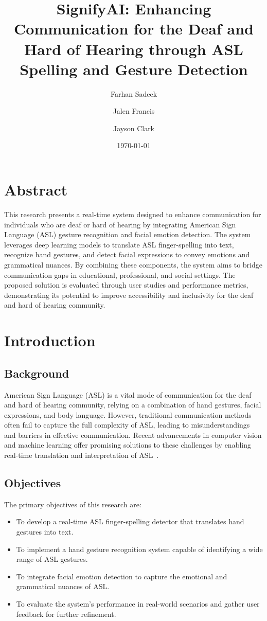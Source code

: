 \documentclass{article}
\title{SignifyAI: Enhancing Communication for the Deaf and Hard of Hearing through ASL Spelling and Gesture Detection}
\author[1*$\dag$]{Farhan Sadeek}
\author[2$\dag$]{Jalen Francis}
\author[3$\dag$]{Jayson Clark}
\affil[1, 2, 3]{Department of Physics, The Ohio State University, Columbus, Ohio.}
\affil[*]{Address correspondence to: sadeek.1@osu.edu}
\affil[$\dag$]{These authors contributed equally to this work.}
\date{\today}
\begin{document}
\maketitle

\section*{Abstract}
This research presents a real-time system designed to enhance communication for individuals who are deaf or hard of hearing by integrating American Sign Language (ASL) gesture recognition and facial emotion detection. The system leverages deep learning models to translate ASL finger-spelling into text, recognize hand gestures, and detect facial expressions to convey emotions and grammatical nuances. By combining these components, the system aims to bridge communication gaps in educational, professional, and social settings. The proposed solution is evaluated through user studies and performance metrics, demonstrating its potential to improve accessibility and inclusivity for the deaf and hard of hearing community.

\section{Introduction}
\subsection{Background}
American Sign Language (ASL) is a vital mode of communication for the deaf and hard of hearing community, relying on a combination of hand gestures, facial expressions, and body language. However, traditional communication methods often fail to capture the full complexity of ASL, leading to misunderstandings and barriers in effective communication. Recent advancements in computer vision and machine learning offer promising solutions to these challenges by enabling real-time translation and interpretation of ASL~\cite{Starner1998}.

\subsection{Objectives}
The primary objectives of this research are:
\begin{itemize}
	\item To develop a real-time ASL finger-spelling detector that translates hand gestures into text.
	\item To implement a hand gesture recognition system capable of identifying a wide range of ASL gestures.
	\item To integrate facial emotion detection to capture the emotional and grammatical nuances of ASL.
	\item To evaluate the system's performance in real-world scenarios and gather user feedback for further refinement.
\end{itemize}
\end{document}
